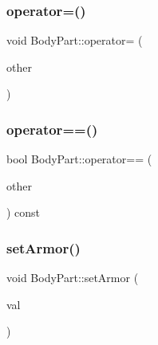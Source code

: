 \mbox{\label{class_body_part_af4df2320cea8651ff589a57778ba4eee}} 
\subsubsection{\texorpdfstring{operator=()}{operator=()}}
{\footnotesize\ttfamily void Body\+Part\+::operator= (\begin{DoxyParamCaption}\item[{const \mbox{\hyperlink{class_body_part}{Body\+Part}} \&}]{other }\end{DoxyParamCaption})}

\mbox{\label{class_body_part_a9fa30957d2740122ef8d3bf1905c2dda}} 
\subsubsection{\texorpdfstring{operator==()}{operator==()}}
{\footnotesize\ttfamily bool Body\+Part\+::operator== (\begin{DoxyParamCaption}\item[{\mbox{\hyperlink{class_body_part}{Body\+Part}} \&}]{other }\end{DoxyParamCaption}) const}

\mbox{\label{class_body_part_a089afe1bbd06d3fc84a9870ec173883c}} 
\subsubsection{\texorpdfstring{set\+Armor()}{setArmor()}}
{\footnotesize\ttfamily void Body\+Part\+::set\+Armor (\begin{DoxyParamCaption}\item[{\mbox{\hyperlink{class_armor}{Armor}}}]{val }\end{DoxyParamCaption})}

